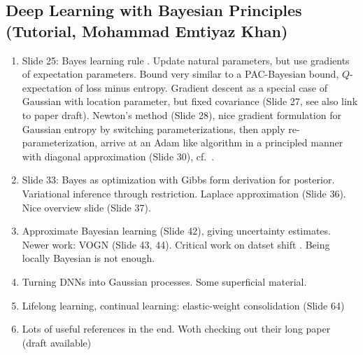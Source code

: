 \documentclass[12pt,a4paper]{article}
\begin{document}
\subsection{Deep Learning with Bayesian Principles \\ (Tutorial, Mohammad Emtiyaz Khan)}
\begin{enumerate}
\item Slide 25: Bayes learning rule \cite{khan2017conjugate}. Update natural parameters, but use gradients of expectation parameters. Bound very similar to a PAC-Bayesian bound, $Q$-expectation of loss minus entropy.  Gradient descent as a special case of Gaussian with location parameter, but fixed covariance (Slide 27, see also link to paper draft). Newton's method (Slide 28), nice gradient formulation for Gaussian entropy  by switching parameterizations, then apply re-parameterization, arrive at an Adam like algorithm in a principled manner with diagonal approximation (Slide 30), cf.~\cite{khan2018fast}. 
\item  Slide 33: Bayes as optimization with Gibbs form derivation for posterior. Variational inference through restriction. Laplace approximation (Slide 36). Nice overview slide (Slide 37).
\item Approximate Bayesian learning (Slide 42), giving uncertainty estimates. Newer work: VOGN \cite{osawa2019practical} (Slide 43, 44). Critical work on datset shift \cite{ovadia2019can}. Being locally Bayesian is not enough. 
\item Turning DNNs into Gaussian processes. Some superficial material.
\item Lifelong learning, continual learning: elastic-weight consolidation \cite{kirkpatrick2017overcoming} (Slide 64)
\item Lots of useful references in the end. Woth checking out their long paper (draft available)
\end{enumerate}
\end{document}
